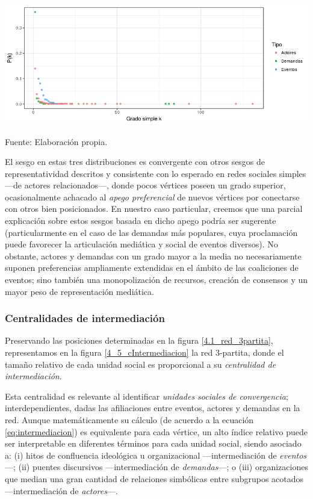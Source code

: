 \documentclass[letterpaper, 11pt]{book}
\theoremstyle{definition}
\theoremstyle{remark}
\begin{document}
\begin{minipage}{\linewidth}
\centering
{} \label{4.4_distribuciones_grado}
\includegraphics[scale=0.7]{img/4.4_distribuciones_grado.png}
\par
\small Fuente: Elaboración propia.
\end{minipage}\bigskip

El sesgo en estas tres distribuciones es convergente con otros sesgos de representatividad descritos y consistente con lo esperado en redes sociales simples ---de actores relacionados---, donde pocos vértices poseen un grado superior, ocasionalmente achacado al \emph{apego preferencial} de nuevos vértices por conectarse con otros bien posicionados. 
En nuestro caso particular, creemos que una parcial explicación sobre estos sesgos basada en dicho apego podría ser sugerente (particularmente en el caso de las demandas más populares, cuya proclamación puede favorecer la articulación mediática y social de eventos diversos). 
No obstante, actores y demandas con un grado mayor a la media no necesariamente suponen preferencias ampliamente extendidas en el ámbito de las coaliciones de eventos; sino también una monopolización de recursos, creación de consensos y un mayor peso de representación mediática. 



\subsubsection{Centralidades de intermediación}
\label{subsubsec:Centralidades_intermediacion_3part}


Preservando las posiciones determinadas en la figura \ref{4.1_red_3partita}, representamos en la figura \ref{4_5_cIntermediacion} la red 3-partita, donde el tamaño relativo de cada unidad social es proporcional a su \emph{centralidad de intermediación}. 


Esta centralidad es relevante al identificar \emph{unidades sociales de convergencia}; interdependientes, dadas las afiliaciones entre eventos, actores y demandas en la red. 
Aunque matemáticamente su cálculo (de acuerdo a la ecuación \ref{eq:intermediacion}) es equivalente para cada vértice, un alto índice relativo puede ser interpretable en diferentes términos para cada unidad social, siendo asociado a: 
(i) hitos de confluencia ideológica u organizacional ---intermediación de \emph{eventos}---; 
(ii) puentes discursivos ---intermediación de \emph{demandas}---; 
o (iii) organizaciones que median una gran cantidad de relaciones simbólicas entre subgrupos acotados ---intermediación de \emph{actores}---. 
\end{document}
